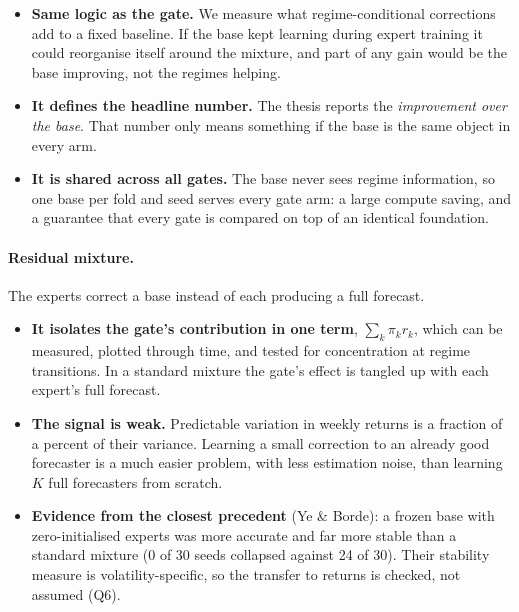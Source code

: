 \begin{whybox}
\begin{itemize}
\item \textbf{Same logic as the gate.} We measure what regime-conditional corrections add to a fixed
  baseline. If the base kept learning during expert training it could reorganise itself around the
  mixture, and part of any gain would be the base improving, not the regimes helping.
\item \textbf{It defines the headline number.} The thesis reports the \emph{improvement over the base}. That
  number only means something if the base is the same object in every arm.
\item \textbf{It is shared across all gates.} The base never sees regime information, so one base per fold and
  seed serves every gate arm: a large compute saving, and a guarantee that every gate is compared on top
  of an identical foundation.
\end{itemize}
\end{whybox}

\paragraph{Residual mixture.} The experts correct a base instead of each producing a full forecast.

\begin{whybox}
\begin{itemize}
\item \textbf{It isolates the gate's contribution in one term}, $\sum_k\pi_k r_k$, which can be measured,
  plotted through time, and tested for concentration at regime transitions. In a standard mixture the
  gate's effect is tangled up with each expert's full forecast.
\item \textbf{The signal is weak.} Predictable variation in weekly returns is a fraction of a percent of
  their variance. Learning a small correction to an already good forecaster is a much easier problem, with
  less estimation noise, than learning $K$ full forecasters from scratch.
\item \textbf{Evidence from the closest precedent} (Ye \& Borde): a frozen base with zero-initialised experts
  was more accurate and far more stable than a standard mixture (0 of 30 seeds collapsed against 24 of 30).
  Their stability measure is volatility-specific, so the transfer to returns is checked, not assumed
  (Q6).
\end{itemize}
\end{whybox}

